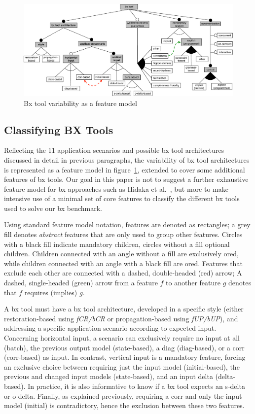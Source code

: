 \begin{figure}[tb!]
	\centering
	\includegraphics[width=\textwidth]{diagrams/foundations/feature-model-bx-tool}
	\caption{Bx tool variability as a feature model}
	\label{fig:featureModelBxTools}
\end{figure}

\subsection{Classifying BX Tools}
\label{sec:classifying-bx-tools}
Reflecting the 11 application scenarios and possible bx tool architectures discussed in detail in previous paragraphs, the variability of bx tool architectures is represented as a feature model in figure~\ref{fig:featureModelBxTools}, extended to cover some additional features of bx tools.
Our goal in this paper is not to suggest a further exhaustive feature model for bx approaches such as Hidaka et al.~\cite{SOSYM-Hidaka2016}, but more to make intensive use of a minimal set of core features to classify the different bx tools used to solve our bx benchmark.

Using standard feature model notation, features are denoted as rectangles; a grey fill denotes \emph{abstract} features that are only used to group other features.
Circles with a black fill indicate mandatory children, circles without a fill optional children.
Children connected with an angle without a fill are exclusively ored, while children connected with an angle with a black fill are ored.
Features that exclude each other are connected with a dashed, double-headed (red) arrow; 
A dashed, single-headed (green) arrow from a feature $f$ to another feature $g$ denotes that $f$ requires (implies) $g$.   


A bx tool must have a bx tool architecture, developed in a specific style (either restoration-based using \emph{fCR/bCR} or propagation-based using \emph{fUP/bUP}), and addressing a specific application scenario according to expected input. 
%
Concerning horizontal input, a scenario can exclusively require no input at all (batch), the previous output model (state-based), a diag (diag-based), or a corr (corr-based) as input.
%
In contrast, vertical input is a mandatory feature, forcing an exclusive choice between requiring just the input model (initial-based), the previous and changed input models (state-based), and an input delta  (delta-based).
In practice, it is also informative to know if a bx tool expects an s-delta or o-delta.
Finally, as explained previously, requiring a corr and only the input model (initial) is contradictory, hence the exclusion between these two features.

